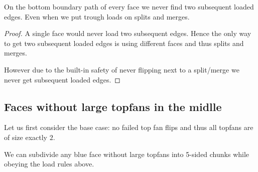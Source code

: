 \begin{lemma}
  \label{lm:}
  On the bottom boundary path of every face we never find two subsequent loaded edges. Even when we put trough loads on splits and merges.
\end{lemma}
\begin{proof}
  A single face would never load two subsequent edges. Hence the only way to get two subsequent loaded edges is using different faces and thus splits and merges.

  However due to the built-in safety of never flipping next to a split/merge we never get subsequent    loaded edges.
\end{proof}


\subsection{Faces without large topfans in the midlle}
Let us first consider the base case: no failed top fan flips and thus all topfans are of size exactly $2$.

\begin{lemma}
  \label{lm:subdiv:withoutTopfan}
  We can subdivide any blue face without large topfans into 5-sided chunks while obeying the load rules above.
\end{lemma}

